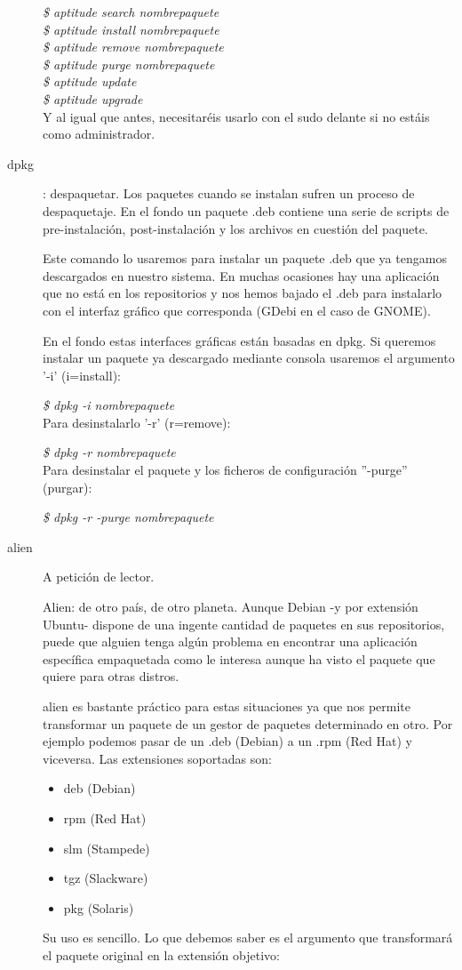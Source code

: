 \documentclass[12pt,spanish,lettersize,twocolumn]{article}
\begin{document}
\begin{description}
\emph{\$ aptitude search nombrepaquete}\\
\emph{\$ aptitude install nombrepaquete}\\
\emph{\$ aptitude remove nombrepaquete}\\
\emph{\$ aptitude purge nombrepaquete}\\
\emph{\$ aptitude update}\\
\emph{\$ aptitude upgrade}\\

Y al igual que antes, necesitar\'eis usarlo con el sudo delante si no est\'ais como administrador.

\item[dpkg]: despaquetar. Los paquetes cuando se instalan sufren un proceso de despaquetaje. En el fondo un paquete .deb contiene una serie de scripts de pre-instalaci\'on, post-instalaci\'on y los archivos en cuesti\'on del paquete.

Este comando lo usaremos para instalar un paquete .deb que ya tengamos descargados en nuestro sistema. En muchas ocasiones hay una aplicaci\'on que no est\'a en los repositorios y nos hemos bajado el .deb para instalarlo con el interfaz gr\'afico que corresponda (GDebi en el caso de GNOME).

En el fondo estas interfaces gr\'aficas est\'an basadas en dpkg. Si queremos instalar un paquete ya descargado mediante consola usaremos el argumento '-i' (i=install):

\emph{\$ dpkg -i nombrepaquete}\\

Para desinstalarlo '-r' (r=remove):

\emph{\$ dpkg -r nombrepaquete}\\

Para desinstalar el paquete y los ficheros de configuraci\'on ''-purge'' (purgar):

\emph{\$ dpkg -r -purge nombrepaquete}\\

\item[alien]
A petici\'on de lector.

Alien: de otro pa\'is, de otro planeta. Aunque Debian -y por extensi\'on Ubuntu- dispone de una ingente cantidad de paquetes en sus repositorios, puede que alguien tenga algún problema en encontrar una aplicaci\'on espec\'ifica empaquetada como le interesa aunque ha visto el paquete que quiere para otras distros.

alien es bastante pr\'actico para estas situaciones ya que nos permite transformar un paquete de un gestor de paquetes determinado en otro. Por ejemplo podemos pasar de un .deb (Debian) a un .rpm (Red Hat) y viceversa. Las extensiones soportadas son:
\begin{itemize}
\item deb (Debian)
\item rpm (Red Hat)
\item slm (Stampede)
\item tgz (Slackware)
\item pkg (Solaris)
\end{itemize}
Su uso es sencillo. Lo que debemos saber es el argumento que transformar\'a el paquete original en la extensi\'on objetivo:


\end{description}
\end{document}

